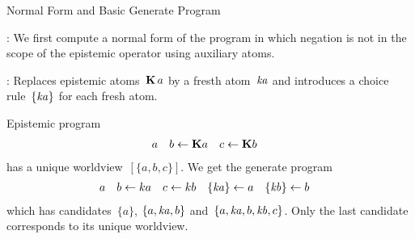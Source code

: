\documentclass[aspectratio=169,svgnames,xcolor=table,t]{beamer}
\begin{document}
\begin{frame}{Normal Form and Basic Generate Program}
    \begin{myitemize}
        \item {}: We first compute a normal form of the program in which negation is not in the scope of the epistemic operator using auxiliary atoms.
        
        \item {}: Replaces epistemic atoms~$\mathbf{K}\,a$ by a fresth atom~$\mathit{ka}$ and introduces a choice rule~$\{ \mathit{ka} \}$ for each fresh atom.
    \end{myitemize}
    Epistemic program
    \begin{align*}
        a && 
        b &\leftarrow \mathbf{K} a
        &
        c &\leftarrow \mathbf{K} b
    \end{align*}
    has a unique worldview~$[\{a,b,c\}]$. 
    \pause
    We get the generate program
    \begin{align*}
        a 
        && 
        b &\leftarrow ka
        &
        c &\leftarrow kb
        &
        \{ \mathit{ka} \} &\leftarrow a
        &
        \{ \mathit{kb} \} &\leftarrow b
    \end{align*}
    which has candidates~$\{a\}$, $\{a,\mathit{ka},b\}$ and~$\{a,\mathit{ka},b,\mathit{kb},c\}$. Only the last candidate corresponds to its unique worldview.
\end{frame}
\end{document}
